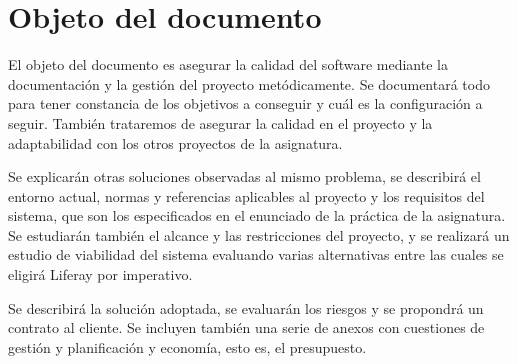 \section{Objeto del documento}

\par El objeto del documento es asegurar la calidad del software mediante la documentación y la gestión del proyecto metódicamente. Se documentará todo para tener constancia de los objetivos a conseguir y cuál es la configuración a seguir. También trataremos de asegurar la calidad en el proyecto y la adaptabilidad con los otros proyectos de la asignatura.

\par Se explicarán otras soluciones observadas al mismo problema, se describirá el entorno actual, normas y referencias aplicables al proyecto y los requisitos del sistema, que son los especificados en el enunciado de la práctica de la asignatura. Se estudiarán también el alcance y las restricciones del proyecto, y se realizará un estudio de viabilidad del sistema evaluando varias alternativas entre las cuales se eligirá Liferay por imperativo.

\par Se describirá la solución adoptada, se evaluarán los riesgos y se propondrá un contrato al cliente. Se incluyen también una serie de anexos con cuestiones de gestión y planificación y economía, esto es, el presupuesto.